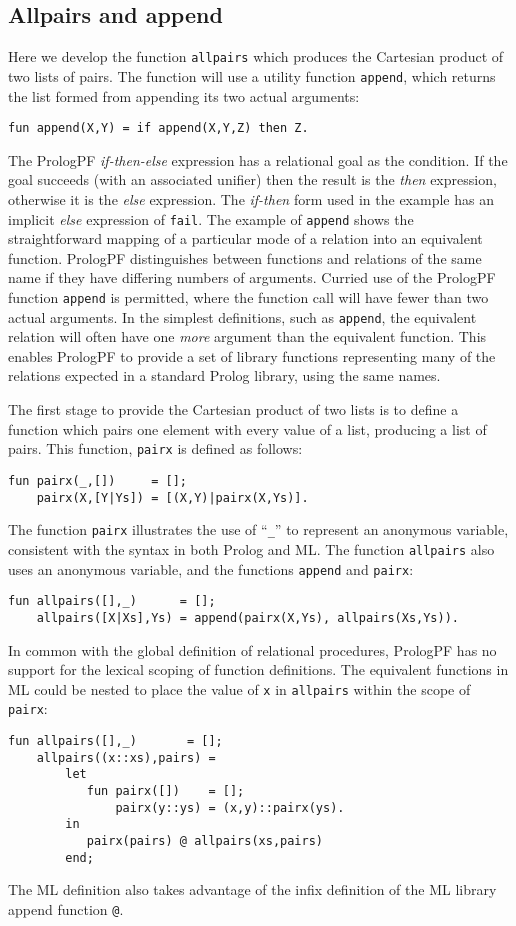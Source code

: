 \subsection{Allpairs and append}

Here we develop the function \texttt{allpairs} which produces the 
Cartesian product of two lists of pairs.  The function will use a
utility function \texttt{append}, which returns the list formed from
appending its two actual arguments:
\begin{verbatim}
fun append(X,Y) = if append(X,Y,Z) then Z.
\end{verbatim}
The PrologPF \textit{if-then-else} expression has a relational goal as
the condition.  If the goal succeeds (with an associated unifier) then
the result is the \textit{then}
expression, otherwise it is the \textit{else} expression.  The \textit{if-then}
form used in the example has an implicit \textit{else} expression of \texttt{fail}.
The example of \texttt{append} shows the straightforward mapping of a particular mode
of a relation into an equivalent function.  PrologPF distinguishes between functions
and relations of the same name if they have differing numbers of arguments.  Curried
use of the PrologPF function \texttt{append} is permitted, where the function call will
have fewer than two actual arguments.  In the simplest definitions, such as \texttt{append},
the equivalent relation will often have one \textit{more} argument than the equivalent
function.  This enables PrologPF to provide a set of library functions representing many
of the relations expected in a standard Prolog library, using the same names.

The first stage to provide the Cartesian product of two lists is to define a function
which pairs one element with every value of a list, producing a list of pairs.  This
function, \texttt{pairx} is defined as follows:
\begin{verbatim}
fun pairx(_,[])     = [];
    pairx(X,[Y|Ys]) = [(X,Y)|pairx(X,Ys)].
\end{verbatim}
The function \texttt{pairx} illustrates the use of ``\texttt{\_{}}'' to
represent an anonymous variable, consistent with the syntax in both Prolog and ML.
The function \texttt{allpairs} also uses an anonymous variable, and the functions
\texttt{append} and \texttt{pairx}:
\begin{verbatim}
fun allpairs([],_)      = [];
    allpairs([X|Xs],Ys) = append(pairx(X,Ys), allpairs(Xs,Ys)).
\end{verbatim}
In common with the global definition of relational procedures, 
PrologPF has no support for the lexical scoping of function definitions.
The equivalent functions in ML could be nested to place the value of \texttt{x}
in \texttt{allpairs} within the scope of \texttt{pairx}:
\begin{verbatim}
fun allpairs([],_)       = [];
    allpairs((x::xs),pairs) = 
        let
           fun pairx([])    = [];
               pairx(y::ys) = (x,y)::pairx(ys).
        in
           pairx(pairs) @ allpairs(xs,pairs)
        end;
\end{verbatim}
The ML definition also takes advantage of the infix definition of the ML library
append function \texttt{@}.

